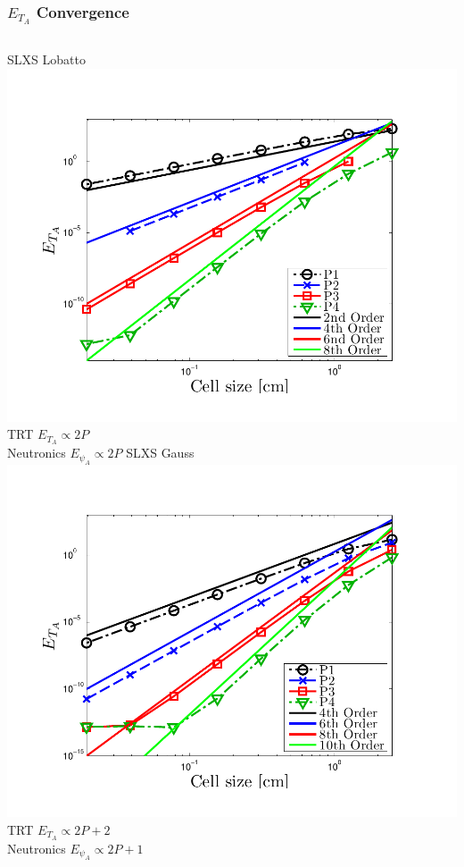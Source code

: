 \documentclass{beamer}
\begin{document}
\begin{frame}
\frametitle{$E_{T_A}$ Convergence}
\begin{columns}[t]
\centering
SLXS Lobatto
\includegraphics[width=\textwidth,trim=0.25in  0.2in 0.75in 0.5in,clip=true]{../chapter6_grey_radtran/Dissertation_Data/Constant_Time_SLXS_Lobatto_temp_A.pdf}
\\
TRT $E_{T_A}\propto 2P$
\\
Neutronics $E_{\psi_A} \propto 2P$
\centering
SLXS Gauss
\includegraphics[width=\textwidth,trim=0.25in  0.2in 0.75in 0.5in,clip=true]{../chapter6_grey_radtran/Dissertation_Data/Constant_Time_SLXS_Gauss_temp_A.pdf}
\\
TRT $E_{T_A} \propto 2P+2 $
\\
 Neutronics $E_{\psi_A} \propto 2P+1$
\end{columns}
\centering
\end{frame}
\end{document}
